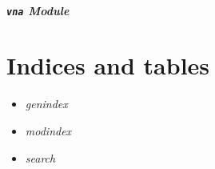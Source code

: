 \documentclass[letterpaper,10pt,english]{sphinxmanual}
\begin{document}
\paragraph{\texttt{vna} Module}
\label{api/mwavepy.virtualInstruments:vna-module}

\chapter{Indices and tables}
\label{index:indices-and-tables}\begin{itemize}
\item {} 
\emph{genindex}

\item {} 
\emph{modindex}

\item {} 
\emph{search}

\end{itemize}
\end{document}
